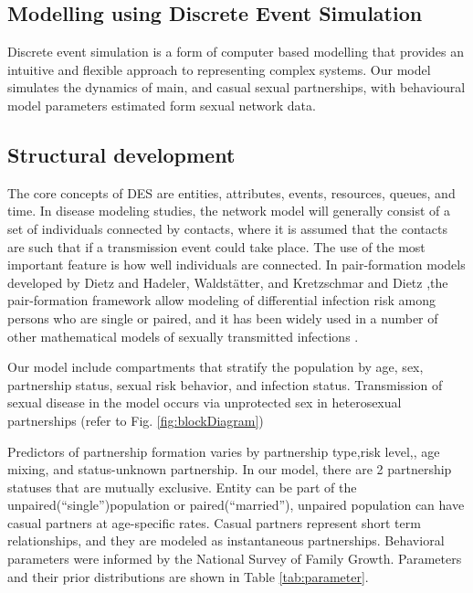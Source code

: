 \documentclass{article}
\begin{document}
\begin{normalsize}
    \section{Modelling using Discrete Event Simulation}
	Discrete event simulation is a form of computer based modelling that provides an intuitive and flexible approach to representing complex systems. Our model simulates the dynamics of main, and casual sexual partnerships, with behavioural model parameters estimated form sexual network data.
	
	\subsection{Structural development}
	The core concepts of DES are entities, attributes, events, resources, queues, and time. In disease modeling studies, the network model will generally consist of a set of individuals connected by contacts, where it is assumed that the contacts are such that if a transmission event could take place. The use of the most important feature is how well individuals are connected. In pair-formation models developed by Dietz and Hadeler, Waldstätter, and Kretzschmar and Dietz \cite{dietz_hadeler_1988} ,the pair-formation framework allow modeling of differential infection risk among persons who are single or paired, and it has been widely used in a number of other mathematical models of sexually transmitted infections \cite{heijne_althaus_herzog_kretzschmar_low_2011, powers_ghani_miller_hoffman_pettifor_kamanga_martinson_cohen_2011,xiridou_geskus_wit_coutinho_kretzschmar_2003, ferguson_garnett_2000}.
	
	Our model include compartments that stratify the population by age, sex, partnership status, sexual risk behavior, and infection status. Transmission of sexual disease in the model occurs via unprotected sex in heterosexual partnerships (refer to Fig. \ref{fig:blockDiagram})
	
	Predictors of partnership formation varies by partnership type,risk level,, age mixing, and status-unknown partnership. In our model, there are 2 partnership statuses that are mutually exclusive. Entity can be part of the unpaired(“single”)population or paired(“married”), unpaired population can have casual partners at age-specific rates. Casual partners represent short term relationships, and they are modeled as instantaneous partnerships. Behavioral parameters were informed by the National Survey of Family Growth. Parameters and their prior distributions \cite{galer_et2019} are shown in Table \ref{tab:parameter}. 
	

\end{normalsize}
\end{document}
